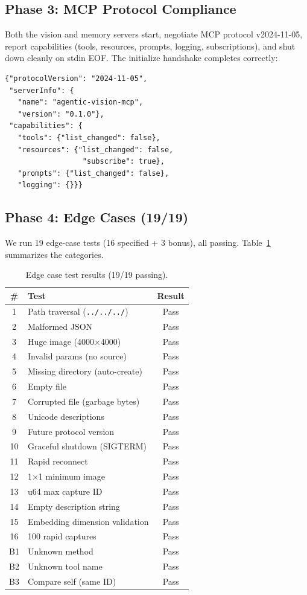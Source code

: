 \documentclass[10pt, twocolumn]{article}
\begin{document}
\subsection{Phase 3: MCP Protocol Compliance}

Both the vision and memory servers start, negotiate MCP protocol v2024-11-05, report capabilities (tools, resources, prompts, logging, subscriptions), and shut down cleanly on stdin EOF. The initialize handshake completes correctly:

\begin{lstlisting}[caption={MCP initialize response (abridged).}]
{"protocolVersion": "2024-11-05",
 "serverInfo": {
   "name": "agentic-vision-mcp",
   "version": "0.1.0"},
 "capabilities": {
   "tools": {"list_changed": false},
   "resources": {"list_changed": false,
                  "subscribe": true},
   "prompts": {"list_changed": false},
   "logging": {}}}
\end{lstlisting}

\subsection{Phase 4: Edge Cases (19/19)}

We run 19 edge-case tests (16 specified + 3 bonus), all passing. Table~\ref{tab:edge} summarizes the categories.

\begin{table}[t]
\caption{Edge case test results (19/19 passing).}
\label{tab:edge}
\centering
\small
\begin{tabular}{@{}clc@{}}
\toprule
\textbf{\#} & \textbf{Test} & \textbf{Result} \\
\midrule
1 & Path traversal (\texttt{../../../}) & Pass \\
2 & Malformed JSON & Pass \\
3 & Huge image (4000$\times$4000) & Pass \\
4 & Invalid params (no source) & Pass \\
5 & Missing directory (auto-create) & Pass \\
6 & Empty file & Pass \\
7 & Corrupted file (garbage bytes) & Pass \\
8 & Unicode descriptions & Pass \\
9 & Future protocol version & Pass \\
10 & Graceful shutdown (SIGTERM) & Pass \\
11 & Rapid reconnect & Pass \\
12 & 1$\times$1 minimum image & Pass \\
13 & u64 max capture ID & Pass \\
14 & Empty description string & Pass \\
15 & Embedding dimension validation & Pass \\
16 & 100 rapid captures & Pass \\
B1 & Unknown method & Pass \\
B2 & Unknown tool name & Pass \\
B3 & Compare self (same ID) & Pass \\
\bottomrule
\end{tabular}
\end{table}
\end{document}
